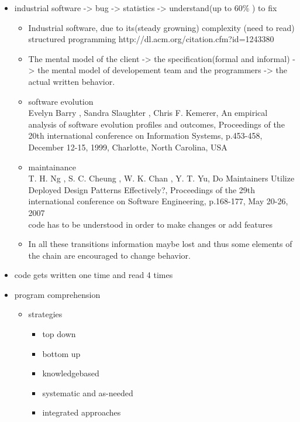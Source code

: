 \begin{itemize}
\item industrial software -> bug -> statistics -> understand(up to 60\% \cite{Basili:1997:EPR:257260.257262} \cite{Pigoski:1996:PSM:524398} ) to fix
	\begin{itemize}
	\item Industrial software, due to its(steady growning) complexity \cite{Lehman:1985:PEP:7261}(need to read) \\ structured programming http://dl.acm.org/citation.cfm?id=1243380
	\item The mental model of the client -> the specification(formal and informal) -> the mental model of developement team and the programmers -> the actual written behavior.
	\item software evolution \\
		Evelyn Barry , Sandra Slaughter , Chris F. Kemerer, An empirical analysis of software evolution profiles and outcomes, Proceedings of the 20th international conference on Information Systems, p.453-458, December 12-15, 1999, Charlotte, North Carolina, USA
	\item maintainance \cite{Lientz:1980:SMM:601062} \cite{ISOSWMaintainance} \\
		T. H. Ng , S. C. Cheung , W. K. Chan , Y. T. Yu, Do Maintainers Utilize Deployed Design Patterns Effectively?, Proceedings of the 29th international conference on Software Engineering, p.168-177, May 20-26, 2007 \\
		code has to be understood \cite{Boehm:1976:SE:1311958.1312684} in order to make changes or add features \cite{Singer97anexamination}
	\item In all these transitions information maybe lost and thus some elements of the chain are encouraged to change behavior.
	\end{itemize}
\item code gets written one time and read 4 times
\item program comprehension
	\begin{itemize}
	\item strategies \cite{Storey:1999:CDE:308936.308940}
		\begin{itemize}
		\item top down
		\item bottom up
		\item knowledgebased
		\item systematic and as-needed
		\item integrated approaches
		\end{itemize}

\end{itemize}
\end{itemize}

